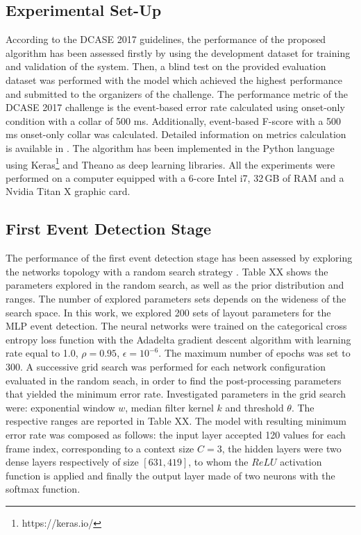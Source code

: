 \documentclass{article}
\begin{document}
\begin{sloppy}
\section{Experimental Set-Up}
\label{sec:experiment}
According to the DCASE 2017 guidelines, the performance of the proposed algorithm has been assessed firstly by using the development dataset for training and validation of the system. Then, a blind test on the provided evaluation dataset was performed with the model which achieved the highest performance and submitted to the organizers of the challenge. The performance metric of the DCASE 2017 challenge is the event-based error rate calculated using onset-only condition with a collar of 500 ms. Additionally, event-based F-score with a 500 ms onset-only collar was calculated. Detailed information on metrics calculation is available in \cite{Mesaros2016_MDPI}. The algorithm has been implemented in the Python language using Keras\footnote{https://keras.io/} and Theano \cite{Theano2016short} as deep learning libraries. All the experiments were performed on a computer equipped with a 6-core Intel i7, 32\,GB of RAM and a Nvidia Titan X graphic card.

\subsection{First Event Detection Stage}
The performance of the first event detection stage has been assessed by exploring the networks topology with a random search strategy \cite{bergstra2012random}. Table XX shows the parameters explored in the random search, as well as the prior distribution and ranges. The
number of explored parameters sets depends on the wideness of the search space. In this work, we explored 200 sets of layout parameters for the MLP event detection. The neural networks were trained on the categorical cross entropy loss function with the Adadelta gradient descent algorithm with learning rate equal to 1.0, $\rho=0.95$, $\epsilon=10^{-6}$. The maximum number of epochs was set to 300. A successive grid search was performed for each network configuration evaluated in the random seach, in order to find the post-processing parameters that yielded the minimum error rate. Investigated parameters in the grid search were: exponential window $w$, median filter kernel $k$ and threshold $\theta$. The respective ranges are reported in Table XX. The model with resulting minimum error rate was composed as follows: the input layer accepted 120 values for each frame index, corresponding to a context size $C=3$, the hidden layers were two dense layers respectively of size $[631,419]$, to whom the $ReLU$ activation function is applied and finally the output layer made of two neurons with the softmax function.


\end{sloppy}
\end{document}
